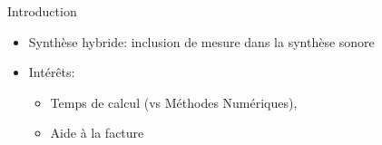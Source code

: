 \begin{frame}{Introduction}
\beamerdefaultoverlayspecification{} %

\begin{itemize}
  \item Synthèse hybride: inclusion de mesure dans la synthèse sonore
  \item Intérêts: 
  \begin{itemize}
      \item Temps de calcul (vs Méthodes Numériques),
      \item Aide à la facture
  \end{itemize}
\end{itemize}

\end{frame}
